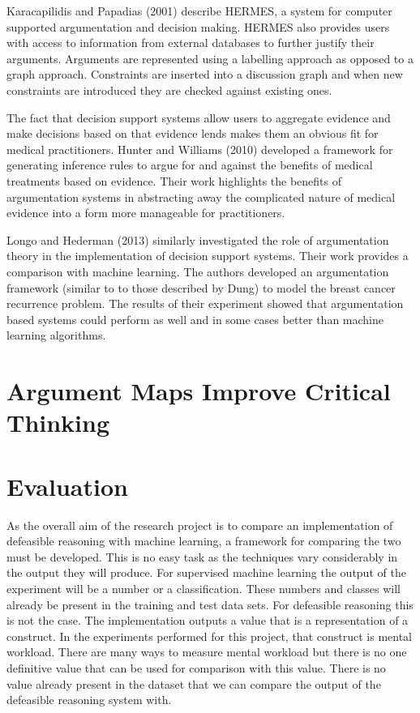 Karacapilidis and Papadias (2001) describe HERMES, a system for computer supported argumentation and decision making. HERMES also provides users with access to information from external databases to further justify their arguments. Arguments are represented using a labelling approach as opposed to a graph approach. Constraints are inserted into a discussion graph and when new constraints are introduced they are checked against existing ones.

The fact that decision support systems allow users to aggregate evidence and make decisions based on that evidence lends makes them an obvious fit for medical practitioners. Hunter and Williams (2010) developed a framework for generating inference rules to argue for and against the benefits of medical treatments based on evidence. Their work highlights the benefits of argumentation systems in abstracting away the complicated nature of medical evidence into a form more manageable for practitioners.

Longo and Hederman (2013) similarly investigated the role of argumentation theory in the implementation of decision support systems. Their work provides a comparison with machine learning. The authors developed an argumentation framework (similar to to those described by Dung) to model the breast cancer recurrence problem. The results of their experiment showed that argumentation based systems could perform as well and in some cases better than machine learning algorithms.


\section{Argument Maps Improve Critical Thinking}



\section{Evaluation}
\label{sec:evaluation}
As the overall aim of the research project is to compare an implementation of defeasible reasoning with machine learning, a framework for comparing the two must be developed. This is no easy task as the techniques vary considerably in the output they will produce. For supervised machine learning the output of the experiment will be a number or a classification. These numbers and classes will already be present in the training and test data sets. For defeasible reasoning this is not the case. The implementation outputs a value that is a representation of a construct. In the experiments performed for this project, that construct is mental workload. There are many ways to measure mental workload but there is no one definitive value that can be used for comparison with this value. There is no value already present in the dataset that we can compare the output of the defeasible reasoning system with.

